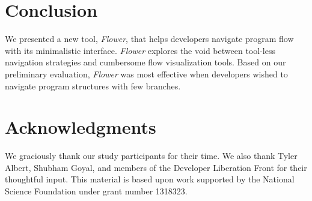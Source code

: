 \documentclass[conference]{IEEEtran}
\begin{document}
\section{Conclusion}

We presented a new tool, \textit{Flower}, that helps developers navigate program flow with its minimalistic interface. 
\textit{Flower} explores the void between tool-less navigation strategies and cumbersome flow visualization tools.
Based on our preliminary evaluation, \textit{Flower}  was most effective when developers wished to navigate program structures with few branches.

\section*{Acknowledgments}
We graciously thank our study participants for their time. 
We also thank Tyler Albert, Shubham Goyal, and members of the Developer Liberation Front for their thoughtful input. 
This material is based upon work supported by the National Science Foundation under grant number 1318323.





\balance




\end{document}
